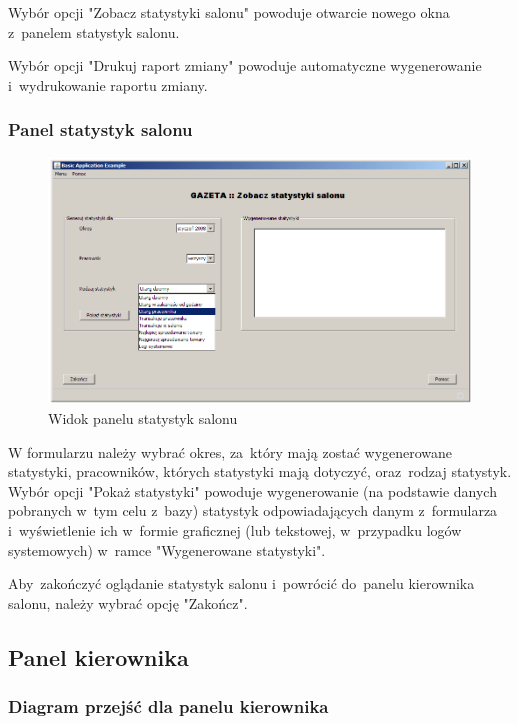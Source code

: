 Wybór opcji "Zobacz statystyki salonu" powoduje otwarcie nowego okna z~panelem statystyk salonu.

Wybór opcji "Drukuj raport zmiany" powoduje automatyczne wygenerowanie i~wydrukowanie raportu zmiany.
\clearpage
\subsubsection{Panel statystyk salonu}
\begin{figure}[h]
\begin{center}
\includegraphics[width=20cm,angle=90,keepaspectratio]{gfx/stat_salonu.png}
\end{center}
\caption{Widok panelu statystyk salonu}
\end{figure}
W formularzu należy wybrać okres, za~który mają zostać wygenerowane statystyki, pracowników, których statystyki mają dotyczyć, oraz~rodzaj statystyk. Wybór opcji "Pokaż statystyki" powoduje wygenerowanie (na podstawie danych pobranych w~tym celu z~bazy) statystyk odpowiadających danym z~formularza i~wyświetlenie ich w~formie graficznej (lub tekstowej, w~przypadku logów systemowych) w~ramce "Wygenerowane statystyki".

Aby~zakończyć oglądanie statystyk salonu i~powrócić do~panelu kierownika salonu, należy wybrać opcję "Zakończ".
\clearpage
\subsection{Panel kierownika}
\subsubsection{Diagram przejść dla panelu kierownika}
\clearpage
